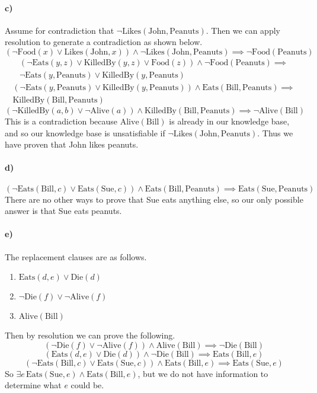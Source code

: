 \documentclass[12pt]{article}
\begin{document}
\paragraph{c)}

Assume for contradiction that \(\neg\text{Likes}(\text{John},\text{Peanuts})\). Then we can apply resolution to generate a contradiction as shown
below.
\[(\neg\text{Food}(x)\lor\text{Likes}(\text{John},x))\land\neg\text{Likes}(\text{John},\text{Peanuts})\implies\neg\text{Food}(\text{Peanuts})\]
\begin{multline*}
        (\neg\text{Eats}(y,z)\lor \text{KilledBy}(y,z)\lor\text{Food}(z))\land\neg\text{Food}(\text{Peanuts})\implies\\
        \neg\text{Eats}(y,\text{Peanuts})\lor \text{KilledBy}(y,\text{Peanuts})
\end{multline*}
\begin{multline*}
        (\neg\text{Eats}(y,\text{Peanuts})\lor \text{KilledBy}(y,\text{Peanuts}))\land\text{Eats}(\text{Bill},\text{Peanuts})\implies\\
        \text{KilledBy}(\text{Bill},\text{Peanuts})
\end{multline*}
\[(\neg\text{KilledBy}(a,b)\lor \neg \text{Alive}(a))\land\text{KilledBy}(\text{Bill},\text{Peanuts})\implies\neg\text{Alive}(\text{Bill})\]
This is a contradiction because \(\text{Alive}(\text{Bill})\) is already in our knowledge base, and so our knowledge base is unsatisfiable if
\(\neg\text{Likes}(\text{John},\text{Peanuts})\). Thus we have proven that John likes peanuts.

\paragraph{d)}

\[(\neg\text{Eats}(\text{Bill},c)\lor\text{Eats}(\text{Sue},c))\land\text{Eats}(\text{Bill},\text{Peanuts})\implies\text{Eats}(\text{Sue},\text{Peanuts})\]
There are no other ways to prove that Sue eats anything else, so our only possible answer is that Sue eats peanuts.

\paragraph{e)}

The replacement clauses are as follows.
\begin{enumerate}
        \item \(\text{Eats}(d,e)\lor \text{Die}(d)\)
        \item \(\neg \text{Die}(f)\lor \neg \text{Alive}(f)\)
        \item \(\text{Alive}(\text{Bill})\)
\end{enumerate}
Then by resolution we can prove the following.
\[(\neg \text{Die}(f)\lor \neg \text{Alive}(f))\land \text{Alive}(\text{Bill})\implies \neg\text{Die}(\text{Bill})\]
\[(\text{Eats}(d,e)\lor \text{Die}(d))\land \neg\text{Die}(\text{Bill})\implies \text{Eats}(\text{Bill},e)\]
\[(\neg\text{Eats}(\text{Bill},c)\lor\text{Eats}(\text{Sue},c))\land\text{Eats}(\text{Bill},e)\implies \text{Eats}(\text{Sue},e)\]
So \(\exists e\,\text{Eats}(\text{Sue},e)\land\text{Eats}(\text{Bill},e)\), but we do not have information to determine what \(e\) could be.
\end{document}
